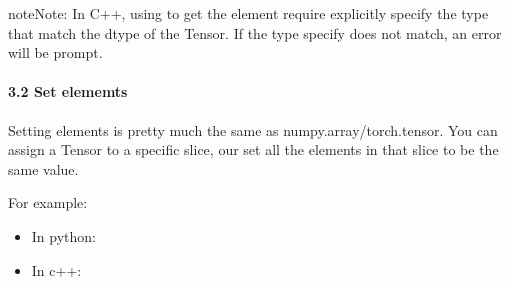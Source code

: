 \documentclass[letterpaper,10pt,english]{sphinxmanual}
\begin{document}
\begin{sphinxadmonition}{note}{Note:}
In C++, using  to get the element require explicitly specify the type that match the dtype of the Tensor. If the type specify does not match, an error will be prompt.
\end{sphinxadmonition}


\paragraph{3.2 Set elememts}
\label{\detokenize{guide/basic_obj/Tensor_3_access:set-elememts}}
Setting elements is pretty much the same as numpy.array/torch.tensor. You can assign a Tensor to a specific slice, our set all the elements in that slice to be the same value.

For example:
\begin{itemize}
\item {} 
In python:

\end{itemize}

\begin{sphinxVerbatim}[commandchars=\\\{\},numbers=left,firstnumber=1,stepnumber=1]
  
  \PYG{p}{[}\PYG{p}{]}

\PYG{p}{[}\PYG{p}{]}  

\PYG{p}{[}\PYG{p}{]}  
\end{sphinxVerbatim}
\begin{itemize}
\item {} 
In c++:

\end{itemize}
\end{document}
